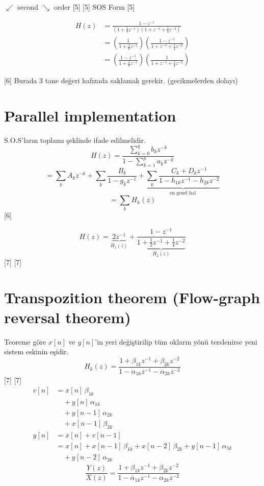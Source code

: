 \documentclass[11pt,a4paper]{article}
\begin{document}
$\swarrow$ second \qquad $\searrow$ order
[5]
[5]
SOS Form
[5]

\begin{ornek}
\begin{align*}
H(z) &= \frac{1 - z^{-1}}{\left(1 + \frac{1}{8}z^{-1}\right)\left(1 + z^{-1} + \frac{1}{4}z^{-2}\right)}\\
&= \left(\frac{1}{1 + \frac{1}{8}z^{-1}}\right)\left(\frac{1 - z^{-1}}{1 + z^{-1} + \frac{1}{4}z^{-2}}\right)\\
&= \left(\frac{1 - z^{-1}}{1 + \frac{1}{8}z^{-1}}\right)\left(\frac{1}{1 + z^{-1} + \frac{1}{4}z^{-2}}\right)
\end{align*}
\end{ornek}

[6]
Burada 3 tane değeri hafızada saklamak gerekir. (gecikmelerden dolayı)

\section{Parallel implementation}
S.O.S'ların toplamı şeklinde ifade edilmelidir.
\[ H(z) = \frac{\sum_{k=0}^{q} b_k z^{-k}}{1 - \sum_{k=1}^{p} a_k z^{-k}} \]
\[ = \sum_k A_k z^{-k} + \sum_k \frac{B_k}{1 - g_k z^{-1}} + \underbrace{\sum_k \frac{C_k + D_k z^{-1}}{1 - h_{1k} z^{-1} - h_{2k} z^{-2}}}_{\text{en genel hal}} \]
\[ = \sum_k H_k(z) \]
[6]

\[ H(z) = \underbrace{2z^{-1}}_{H_1(z)} + \underbrace{\frac{1 - z^{-1}}{1 + \frac{1}{2}z^{-1} + \frac{1}{4}z^{-2}}}_{H_2(z)} \]
[7]
[7]

\section{Transpozition theorem (Flow-graph reversal theorem)}
Teoreme göre $x[n]$ ve $y[n]$'in yeri değiştirilip tüm okların yönü terslenirse yeni sistem eskinin eşidir.
\[ H_k(z) = \frac{1 + \beta_{1k} z^{-1} + \beta_{2k} z^{-2}}{1 - \alpha_{1k} z^{-1} - \alpha_{2k} z^{-2}} \]
[7]
[7]
\begin{align*}
v[n] &= x[n]\,\beta_{1k}\\
&\quad + y[n]\,\alpha_{1k}\\
&\quad + y[n-1]\,\alpha_{2k}\\
&\quad + x[n-1]\,\beta_{2k}\\
y[n] &= x[n] + v[n-1]\\
&= x[n] + x[n-1]\,\beta_{1k} + x[n-2]\,\beta_{2k} + y[n-1]\,\alpha_{1k}\\
&\quad + y[n-2]\,\alpha_{2k}
\end{align*}
\[ \frac{Y(z)}{X(z)} = \frac{1 + \beta_{1k} z^{-1} + \beta_{2k} z^{-2}}{1 - \alpha_{1k} z^{-1} - \alpha_{2k} z^{-2}} \]
\end{document}

